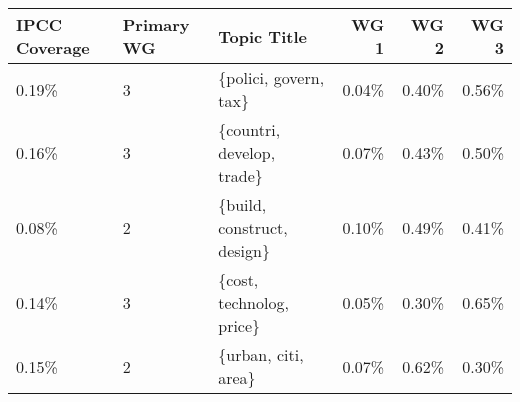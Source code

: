 \begin{tabular}{p{1.4cm} p{1cm} l r r r}
\toprule
 IPCC Coverage &  Primary WG &                 Topic Title &  WG 1 &  WG 2 &  WG 3 \\
\midrule
         0.19\% &           3 &       \{polici, govern, tax\} & 0.04\% & 0.40\% & 0.56\% \\
         0.16\% &           3 &   \{countri, develop, trade\} & 0.07\% & 0.43\% & 0.50\% \\
         0.08\% &           2 &  \{build, construct, design\} & 0.10\% & 0.49\% & 0.41\% \\
         0.14\% &           3 &    \{cost, technolog, price\} & 0.05\% & 0.30\% & 0.65\% \\
         0.15\% &           2 &         \{urban, citi, area\} & 0.07\% & 0.62\% & 0.30\% \\
\bottomrule
\end{tabular}
